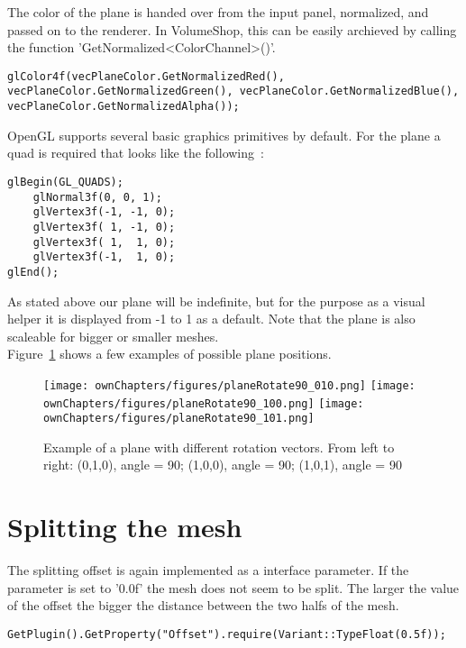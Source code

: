 The color of the plane is handed over from the input panel, normalized, and passed on to the renderer. In VolumeShop, this can be easily archieved by calling the function 'GetNormalized<ColorChannel>()'.
\begin{lstlisting}
glColor4f(vecPlaneColor.GetNormalizedRed(), vecPlaneColor.GetNormalizedGreen(), vecPlaneColor.GetNormalizedBlue(), vecPlaneColor.GetNormalizedAlpha());
\end{lstlisting}

OpenGL supports several basic graphics primitives by default. For the plane a quad is required that looks like the following~\cite{book:computerGraphicsHill}: %
\begin{lstlisting}
glBegin(GL_QUADS);
	glNormal3f(0, 0, 1);
	glVertex3f(-1, -1, 0);
	glVertex3f( 1, -1, 0);
	glVertex3f( 1,  1, 0);
	glVertex3f(-1,  1, 0);
glEnd();
\end{lstlisting}

As stated above our plane will be indefinite, but for the purpose as a visual helper it is displayed from -1 to 1 as a default. Note that the plane is also scaleable for bigger or smaller meshes.\\

Figure~\ref{fig:plane} shows a few examples of possible plane positions.
\begin{figure}%
\centering
\texttt{[image: ownChapters/figures/planeRotate90\_010.png]}%
\hspace{5.00mm}
\texttt{[image: ownChapters/figures/planeRotate90\_100.png]}%
\hspace{5.00mm}
\texttt{[image: ownChapters/figures/planeRotate90\_101.png]}%
\caption{Example of a plane with different rotation vectors. From left to right: (0,1,0), angle = 90; (1,0,0), angle = 90; (1,0,1), angle = 90}%
\label{fig:plane}%
\end{figure}

\section{Splitting the mesh}

The splitting offset is again implemented as a interface parameter. If the parameter is set to '0.0f' the mesh does not seem to be split. The larger the value of the offset the bigger the distance between the two halfs of the mesh.
\begin{lstlisting}
GetPlugin().GetProperty("Offset").require(Variant::TypeFloat(0.5f));
\end{lstlisting}

